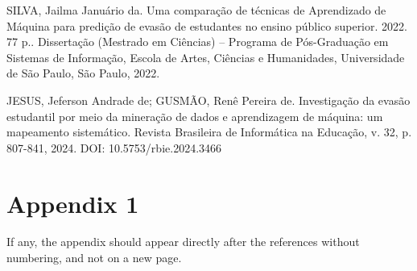\documentclass[english, spanish, brazilian]{RBIEarticle} %
\begin{document}
SILVA, Jailma Januário da. Uma comparação de técnicas de Aprendizado de Máquina para predição de evasão de estudantes no ensino público superior. 2022. 77 p.. Dissertação (Mestrado em Ciências) – Programa de Pós-Graduação em Sistemas de Informação, Escola de Artes, Ciências e Humanidades, Universidade de São Paulo, São Paulo, 2022.

JESUS, Jeferson Andrade de; GUSMÃO, Renê Pereira de. Investigação da evasão estudantil por meio da mineração de dados e aprendizagem de máquina: um mapeamento sistemático. Revista Brasileira de Informática na Educação, v. 32, p. 807-841, 2024. DOI: 10.5753/rbie.2024.3466




\iffalse %
     \section*{Appendix 1}
    \label{apendice1}
    
    If any, the appendix should appear directly after the references without numbering, and not on a new page.
    
\end{document}
